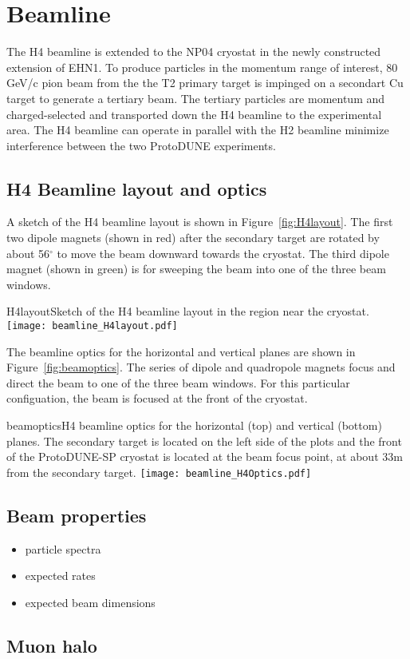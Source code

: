 \section{Beamline}
\label{sec:h4beamline}

The H4 beamline is extended to the NP04 cryostat in the newly constructed extension of EHN1. To produce particles in the momentum range of interest, 80 GeV/c pion beam from the the T2 primary target is impinged on a secondart Cu target to generate a tertiary beam. The tertiary particles are momentum and charged-selected and transported down the H4 beamline to the experimental area. The H4 beamline can operate in parallel with the H2 beamline minimize interference between the two ProtoDUNE experiments.

\subsection{H4 Beamline layout and optics}

A sketch of the H4 beamline layout is shown in Figure~\ref{fig:H4layout}. The first two dipole magnets (shown in red) after the secondary target are rotated by about 56$^\circ$ to move the beam downward towards the cryostat. The third dipole magnet (shown in green) is for sweeping the beam into one of the three beam windows.
\begin{cdrfigure}{H4layout}{Sketch of the H4 beamline layout in the region near the cryostat.}
  \texttt{[image: beamline\_H4layout.pdf]}
\end{cdrfigure}


The beamline optics for the horizontal and vertical planes are shown in Figure~\ref{fig:beamoptics}. The series of dipole and quadropole magnets focus and direct the beam to one of the three beam windows. For this particular configuation, the beam is focused at the front of the cryostat.
\begin{cdrfigure}{beamoptics}{H4 beamline optics for the horizontal (top) and vertical (bottom) planes. The secondary target is located on the left side of the plots and the front of the ProtoDUNE-SP cryostat is located at the beam focus point, at about 33m from the secondary target.}
  \texttt{[image: beamline\_H4Optics.pdf]}
\end{cdrfigure}

\subsection{Beam properties}
\begin{itemize}
\item particle spectra
\item expected rates
\item expected beam dimensions 
\end{itemize}

\subsection{Muon halo}




